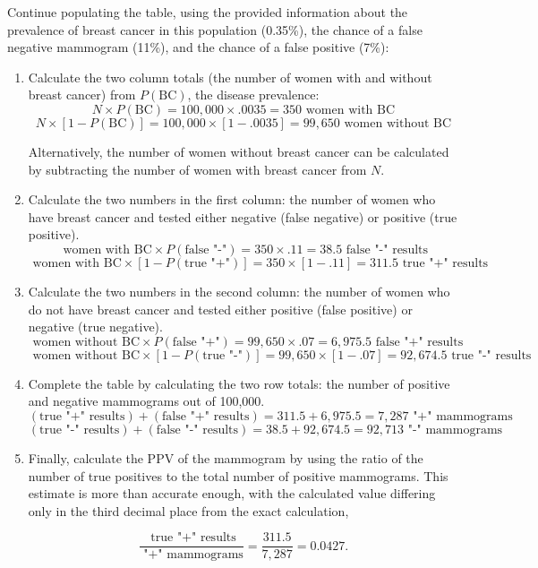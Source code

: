 Continue populating the table, using the provided information about the prevalence of breast cancer in this population (0.35\%), the chance of a false negative mammogram (11\%), and the chance of a false positive (7\%):

\begin{enumerate}
	\item Calculate the two column totals (the number of women with and without breast cancer) from $P(\text{BC})$, the disease prevalence:
	\[N \times P(\text{BC}) = 100,000 \times .0035 = 350 \text{ women with BC}\]
	\[N \times [1 - P(\text{BC})] = 100,000 \times [1 - .0035] = 99,650 \text{ women without BC}\]
	
	Alternatively, the number of women without breast cancer can be calculated by subtracting the number of women with breast cancer from $N$.
	
	\item Calculate the two numbers in the first column: the number of women who have breast cancer and tested either negative (false negative) or positive (true positive).
	\[\text{ women with BC} \times P(\text{false "-"}) = 350 \times .11 = 38.5 \text{ false "-" results}\]
	\[\text{ women with BC} \times [1 - P(\text{true "+"})] = 350 \times [1 - .11] = 311.5 \text{ true "+" results}\]
	
	\item Calculate the two numbers in the second column: the number of women who do not have breast cancer and tested either positive (false positive) or negative (true negative). 
	\[\text{ women without BC} \times P(\text{false "+"}) = 99,650 \times .07 = 6,975.5 \text{ false "+" results}\]
	\[\text{ women without BC} \times [1 - P(\text{true "-"})] = 99,650 \times [1 - .07] = 92,674.5 \text{ true "-" results}\]
	
	\item Complete the table by calculating the two row totals: the number of positive and negative mammograms out of 100,000.
	\[(\text{true "+" results}) + (\text{false "+" results}) = 311.5 + 6,975.5 = 7,287 \text{ "+" mammograms}\]
	\[(\text{true "-" results}) + (\text{false "-" results}) = 38.5 + 92,674.5 = 92,713 \text{ "-" mammograms}\]
	
	\item Finally, calculate the PPV of the mammogram by using the ratio of the number of true positives to the total number of positive mammograms. This estimate is more than accurate enough, with the calculated value differing only in the third decimal place from the exact calculation, 
	
	\[\dfrac{\text{ true "+" results}}{\text{ "+" mammograms}} = \dfrac{311.5}{7,287} = 0.0427. \]
	
\end{enumerate}

